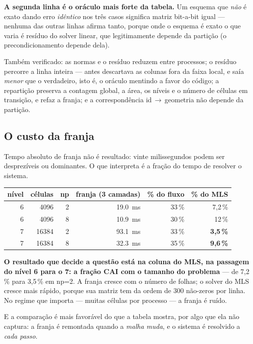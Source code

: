 \textbf{A segunda linha é o oráculo mais forte da tabela.} Um esquema que
\emph{não} é exato dando erro \emph{idêntico} nos três casos significa matriz
bit-a-bit igual --- nenhuma das outras linhas afirma tanto, porque onde o esquema é
exato o que varia é resíduo do solver linear, que legitimamente depende da
partição (o precondicionamento depende dela).

Também verificado: as normas e o resíduo reduzem entre processos; o resíduo
percorre a linha inteira --- antes descartava as colunas fora da faixa local, e
saía \emph{menor} que o verdadeiro, isto é, o oráculo mentindo a favor do código;
a repartição preserva a contagem global, a área, os níveis e o número de células
em transição, e refaz a franja; e a correspondência id\,$\to$\,geometria não
depende da partição.

\subsection{O custo da franja}
\label{sec:par-custo}

Tempo absoluto de franja não é resultado: vinte milissegundos podem ser
desprezíveis ou dominantes. O que interpreta é a fração do tempo de resolver o
sistema.

\begin{center}
\begin{tabular}{rrrrrr}
\toprule
nível & células & np & franja (3 camadas) & \% do fluxo & \% do MLS \\
\midrule
6 & \num{4096}  & 2 & \SI{19.0}{\milli\second} & 33\,\% & 7,2\,\% \\
6 & \num{4096}  & 8 & \SI{10.9}{\milli\second} & 30\,\% & 12\,\% \\
7 & \num{16384} & 2 & \SI{93.1}{\milli\second} & 33\,\% & \textbf{3,5\,\%} \\
7 & \num{16384} & 8 & \SI{32.3}{\milli\second} & 35\,\% & \textbf{9,6\,\%} \\
\bottomrule
\end{tabular}
\end{center}

\textbf{O resultado que decide a questão está na coluna do MLS, na passagem do
nível 6 para o 7: a fração CAI com o tamanho do problema} --- de 7,2\,\% para
3,5\,\% em np=2. A franja cresce com o número de folhas; o solver do MLS cresce
mais rápido, porque sua matriz tem da ordem de 300 não-zeros por linha. No regime
que importa --- muitas células por processo --- a franja é ruído.

E a comparação é mais favorável do que a tabela mostra, por algo que ela não
captura: a franja é remontada quando a \emph{malha muda}, e o sistema é resolvido
a \emph{cada passo}.

